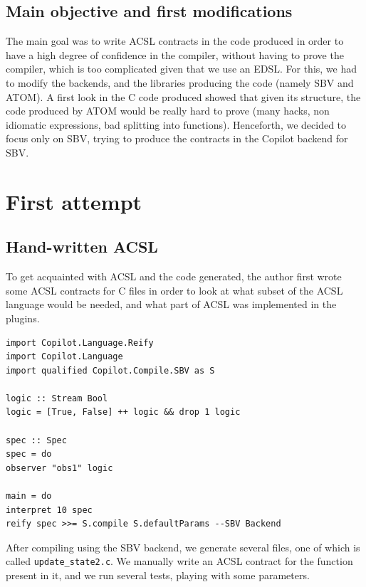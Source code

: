 \documentclass[a4paper,11pt,final]{article}
\begin{document}
	\subsection{Main objective and first modifications}
	The main goal was to write ACSL contracts in the code produced in order to have a high degree of confidence in the compiler, without having to prove the compiler, which is too complicated given that we use an EDSL. For this, we had to modify the backends, and the libraries producing the code (namely SBV and ATOM). A first look in the C code produced showed that given its structure, the code produced by ATOM would be really hard to prove (many hacks, non idiomatic expressions, bad splitting into functions). Henceforth, we decided to focus only on SBV, trying to produce the contracts in the Copilot backend for SBV.
	
	\section{First attempt}
	\subsection{Hand-written ACSL}
	
	To get acquainted with ACSL and the code generated, the author first wrote some ACSL contracts for C files in order to look at what subset of the ACSL language would be needed, and what part of ACSL was implemented in the plugins.
	
\begin{verbatim}
import Copilot.Language.Reify
import Copilot.Language
import qualified Copilot.Compile.SBV as S

logic :: Stream Bool
logic = [True, False] ++ logic && drop 1 logic

spec :: Spec
spec = do
observer "obs1" logic

main = do
interpret 10 spec
reify spec >>= S.compile S.defaultParams --SBV Backend

\end{verbatim}
	
	After compiling using the SBV backend, we generate several files, one of which is called \texttt{update\_state2.c}. We manually write an ACSL contract for the function present in it, and we run several tests, playing with some parameters.
	
\end{document}
